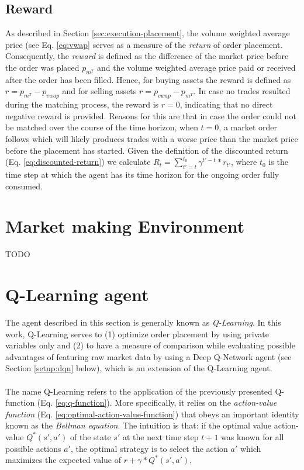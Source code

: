 \subsection{Reward}
\label{setup:reward}
As described in Section \ref{sec:execution-placement}, the volume weighted average price (see Eq. \ref{eq:vwap} serves as a measure of the \textit{return} of order placement.
Consequently, the \textit{reward} is defined as the difference of the market price before the order was placed $p_{m^T}$ and the volume weighted average price paid or received after the order has been filled. 
Hence, for buying assets the reward is defined as $r=p_{m^T}-p_{vwap}$ and for selling assets $r=p_{vwap}-p_{m^T}$.
In case no trades resulted during the matching process, the reward is $r=0$, indicating that no direct negative reward is provided.
Reasons for this are that in case the order could not be matched over the course of the time horizon, when $t=0$, a market order follows which will likely produces trades with a worse price than the market price before the placement has started.
Given the definition of the discounted return (Eq. \ref{eq:discounted-return}) we calculate $R_t=\sum_{t'=t}^{t_0}{\gamma^{t'-t}*r_{t'}}$, where $t_0$ is the time step at which the agent has its time horizon for the ongoing order fully consumed.

\section{Market making Environment}
TODO


\section{Q-Learning agent}
\label{setup:q-learning}

The agent described in this section is generally known as \textit{Q-Learning}\cite{watkins1992q}.
In this work, Q-Learning serves to (1) optimize order placement by using private variables only and (2) to have a measure of comparison while evaluating possible advantages of featuring raw market data by using a Deep Q-Network agent (see Section \ref{setup:dqn} below), which is an extension of the Q-Learning agent.
\\
\\
The name Q-Learning refers to the application of the previously presented Q-function (Eq. \ref{eq:q-function}).
More specifically, it relies on the \textit{action-value function} (Eq. \ref{eq:optimal-action-value-function}) that obeys an important identity known as the \textit{Bellman equation}.
The intuition is that: if the optimal value action-value $Q^*(s',a')$ of the state $s'$ at the next time step $t+1$ was known for all possible actions $a'$, the optimal strategy is to select the action $a'$ which maximizes the expected value of $r+\gamma*Q^*(s',a')$,

